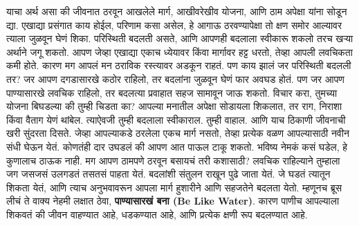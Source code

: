  याचा अर्थ असा की जीवनात ठरवून आखलेले मार्ग, आखीवरेखीव योजना,
 आणि ठाम अपेक्षा यांना सोडून द्या. एखाद्या प्रसंगात काय होईल, परिणाम कसा असेल, हे आगाऊ ठरवण्यापेक्षा तो क्षण समोर आल्यावर त्याला जुळवून घेणं शिका. परिस्थिती बदलती असते, आणि आपणही बदलाला स्वीकारू शकलो तरच खऱ्या अर्थाने जगू शकतो.
आपण जेव्हा एखाद्या एकाच ध्येयावर किंवा मार्गावर हट्ट धरतो, तेव्हा आपली लवचिकता कमी होते.
 कारण मग आपलं मन ठराविक रस्त्यावर अडकून राहतं. पण काय झालं जर परिस्थिती बदलली तर?
 जर आपण दगडासारखे कठोर राहिलो, तर बदलांना जुळवून घेणं फार अवघड होतं. पण जर आपण पाण्यासारखे लवचिक राहिलो, तर बदलत्या प्रवाहात सहज सामावून जाऊ शकतो.
विचार करा, तुमच्या योजना बिघडल्या की तुम्ही चिडता का? आपल्या मनातील अपेक्षा सोडायला शिकलात,
 तर राग, निराशा किंवा वैताग येणं थांबेल. त्याऐवजी तुम्ही बदलाला स्वीकाराल. तुम्ही वाहाल.
आणि याच ठिकाणी जीवनाची खरी सुंदरता दिसते. जेव्हा आपल्याकडे ठरलेला एकच मार्ग नसतो,
 तेव्हा प्रत्येक वळण आपल्यासाठी नवीन संधी घेऊन येतं. कोणतंही दार उघडलं की आपण आत पाऊल टाकू शकतो. भविष्य नेमकं कसं घडेल, हे कुणालाच ठाऊक नाही. मग आपण ठामपणे ठरवून बसायचं तरी कशासाठी?
लवचिक राहिल्याने तुम्हाला जग जसजसं उलगडतं तसतसं पाहता येतं. बदलांशी संतुलन राखून पुढे जाता येतं.
 जे घडतं त्यातून शिकता येतं, आणि त्याच अनुभवावरून आपला मार्ग हुशारीने आणि सहजतेने बदलता येतो.
म्हणूनच ब्रूस लीचं ते वाक्य नेहमी लक्षात ठेवा,  \textbf{पाण्यासारखं बना (Be Like Water)}. कारण पाणीच आपल्याला शिकवतं की जीवन वाहण्यात आहे, धडकण्यात आहे, आणि प्रत्येक क्षणी रूप बदलण्यात आहे.
